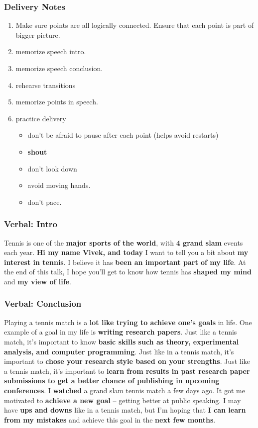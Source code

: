 \begin{frame}
\frametitle{Delivery Notes}
\begin{enumerate}
\item \small Make sure points are all logically connected.  Ensure that each point is part of bigger picture.
\item \small memorize speech intro.
\item \small memorize speech conclusion.
\item \small rehearse transitions
\item \small memorize points in speech. 
\item \small practice delivery
\begin{itemize}
\item \tiny don't be afraid to pause after each point (helps avoid restarts)
\item \tiny \textbf{shout}  
\item \tiny don't look down
\item \tiny avoid moving hands. 
\item \tiny don't pace. 
\end{itemize}
\end{enumerate}
\end{frame} 


\begin{frame}  
\frametitle{Verbal: Intro} 
Tennis is one of the \textbf{major sports of the world}, with
\textbf{4 grand slam} events each year.  \textbf{Hi my name Vivek, and
  today} I want to tell you a bit about \textbf{my interest in
  tennis}. I believe it has \textbf{been an important part of my life}.
At the end of this talk, I hope you'll get to know how tennis has \textbf{shaped my mind}
and \textbf{my view of life}. 

\end{frame}




\begin{frame}
\frametitle{Verbal: Conclusion}

Playing a tennis match  is a \textbf{lot like trying to achieve one's
  goals} in life. One example of a goal in my life is \textbf{writing
  research papers}. Just like a tennis match, it's important to know
\textbf{basic skills such as theory, experimental analysis, and
  computer programming}.  Just like in a tennis match, it's important
to \textbf{chose your research style based on your strengths}. Just
like a tennis match, it's important to \textbf{learn from results in
  past research paper submissions to get a better chance of publishing
  in upcoming conferences}.  I \textbf{watched} a grand slam tennis
match a few days ago. It got me motivated to \textbf{achieve a new
  goal} -- getting better at public speaking. I may have \textbf{ups
  and downs} like in a tennis match, but I'm hoping that \textbf{I can
  learn from my mistakes} and achieve this goal in the \textbf{next
  few months}. 


\end{frame}
